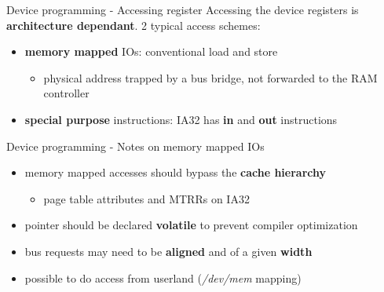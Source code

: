 \begin{frame}{Device programming - Accessing register}
  Accessing the device registers is \textbf{architecture dependant}. 2 typical access schemes:
  \begin{itemize}
  \item \textbf{memory mapped} IOs: conventional load and store
    \begin{itemize}
    \item physical address trapped by a bus bridge, not forwarded to the RAM controller
    \end{itemize}
  \item \textbf{special purpose} instructions: IA32 has \textbf{in} and \textbf{out} instructions
  \end{itemize}
\end{frame}

\begin{frame}{Device programming - Notes on memory mapped IOs}
  \begin{itemize}
  \item memory mapped accesses should bypass the \textbf{cache hierarchy}
    \begin{itemize}
    \item page table attributes and MTRRs on IA32
    \end{itemize}
  \item pointer should be declared \textbf{volatile} to prevent compiler optimization
  \item bus requests may need to be \textbf{aligned} and of a given \textbf{width}
  \item possible to do access from userland (\textit{/dev/mem} mapping)
  \end{itemize}
\end{frame}

